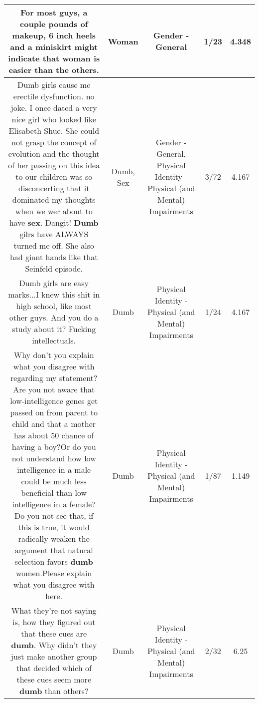 \documentclass[11pt]{article}
\newlength\mylength
\begin{document}
\begin{center}
\begin{longtable}{|C{.65\mylength}|C{.30\mylength}|C{.12\mylength}|C{.12\mylength}|C{.12\mylength}|}
  \small For most guys, a couple pounds of makeup, 6 inch heels and a miniskirt might indicate that \textbf{woman} is easier than the others.\normalsize   & Woman & Gender - General & 1/23 & 4.348 \\  \hline
  \small Dumb girls cause me erectile dysfunction.  no joke.  I once dated a very nice girl who looked like Elisabeth Shue.  She could not grasp the concept of evolution and the thought of her passing on this idea to our children was so disconcerting that it dominated my thoughts when we wer about to have \textbf{sex}.  Dangit!  \textbf{Dumb} gilrs have ALWAYS turned me off.  She also had giant hands like that Seinfeld episode.\normalsize   & Dumb, Sex & Gender - General, Physical Identity - Physical (and Mental) Impairments & 3/72 & 4.167 \\  \hline
  \small Dumb girls are easy marks...I knew this shit in high school, like most other guys.  And you do a study about it?  Fucking intellectuals.\normalsize   & Dumb & Physical Identity - Physical (and Mental) Impairments & 1/24 & 4.167 \\  \hline
  \small Why don't you explain what you disagree with regarding my statement?Are you not aware that low-intelligence genes get passed on from parent to child and that a mother has about 50 chance of having a boy?Or do you not understand how low intelligence in a male could be much less beneficial than low intelligence in a female?Do you not see that, if this is true, it would radically weaken the argument that natural selection favors \textbf{dumb} women.Please explain what you disagree with here.\normalsize   & Dumb & Physical Identity - Physical (and Mental) Impairments & 1/87 & 1.149 \\  \hline
  \small What they're not saying is, how they figured out that these cues are \textbf{dumb}. Why didn't they just make another group that decided which of these cues seem more \textbf{dumb} than others?\normalsize   & Dumb & Physical Identity - Physical (and Mental) Impairments & 2/32 & 6.25 \\  \hline

\end{longtable}
\end{center}
\end{document}
